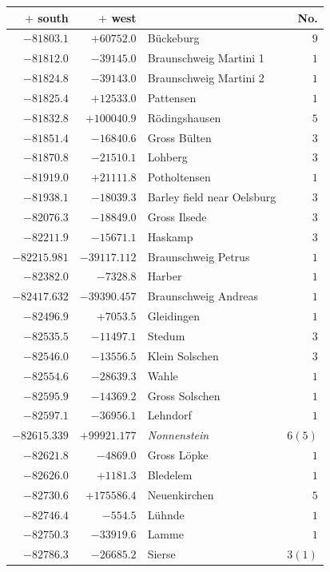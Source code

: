 \clearpage{}%
\begin{center}\begingroup\fontsize{8}{9}\selectfont
\setlength{\tabcolsep}{4pt}
\begin{tabular}{r|r|p{170pt}|r}\hline
\(+\) south&\(+\) west&&No.\\\hline
\(-81803.1\)&\(+60752.0\)&Bückeburg&\(9\)\\
\(-81812.0\)&\(-39145.0\)&Braunschweig Martini 1&\(1\)\\
\(-81824.8\)&\(-39143.0\)&Braunschweig Martini 2&\(1\)\\
\(-81825.4\)&\(+12533.0\)&Pattensen&\(1\)\\
\(-81832.8\)&\(+100040.9\)&Rödingshausen&\(5\)\\
\(-81851.4\)&\(-16840.6\)&Gross Bülten&\(3\)\\
\(-81870.8\)&\(-21510.1\)&Lohberg&\(3\)\\
\(-81919.0\)&\(+21111.8\)&Potholtensen&\(1\)\\
\(-81938.1\)&\(-18039.3\)&Barley field near Oelsburg&\(3\)\\
\(-82076.3\)&\(-18849.0\)&Gross Ilsede&\(3\)\\
\(-82211.9\)&\(-15671.1\)&Haskamp&\(3\)\\
\(-82215.981\)&\(-39117.112\)&Braunschweig Petrus&\(1\)\\
\(-82382.0\)&\(-7328.8\)&Harber&\(1\)\\
\(-82417.632\)&\(-39390.457\)&Braunschweig Andreas&\(1\)\\
\(-82496.9\)&\(+7053.5\)&Gleidingen&\(1\)\\
\(-82535.5\)&\(-11497.1\)&Stedum&\(3\)\\
\(-82546.0\)&\(-13556.5\)&Klein Solschen&\(3\)\\
\(-82554.6\)&\(-28639.3\)&Wahle&\(1\)\\
\(-82595.9\)&\(-14369.2\)&Gross Solschen&\(1\)\\
\(-82597.1\)&\(-36956.1\)&Lehndorf&\(1\)\\
\(-82615.339\)&\(+99921.177\)&\textit{Nonnenstein}&\(6 (5)\)\\
\(-82621.8\)&\(-4869.0\)&Gross Löpke&\(1\)\\
\(-82626.0\)&\(+1181.3\)&Bledelem&\(1\)\\
\(-82730.6\)&\(+175586.4\)&Neuenkirchen&\(5\)\\
\(-82746.4\)&\(-554.5\)&Lühnde&\(1\)\\
\(-82750.3\)&\(-33919.6\)&Lamme&\(1\)\\
\(-82786.3\)&\(-26685.2\)&Sierse&\(3 (1)\)\\

\end{tabular}
\end{center}
